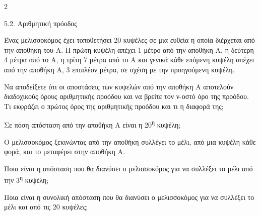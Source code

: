 \begin{ylh}{2}
    \item 5.2. Αριθμητική πρόοδος
\end{ylh}
Ένας μελισσοκόμος έχει τοποθετήσει 20 κυψέλες σε μια ευθεία η οποία διέρχεται από την αποθήκη του Α. Η πρώτη κυψέλη απέχει 1 μέτρο από την αποθήκη Α, η δεύτερη 4 μέτρα από το Α, η τρίτη 7 μέτρα από το Α και γενικά κάθε επόμενη κυψέλη απέχει από την αποθήκη Α, 3 επιπλέον μέτρα, σε σχέση με την προηγούμενη κυψέλη.

\begin{alist}
\item Να αποδείξετε ότι οι αποστάσεις των κυψελών από την αποθήκη Α αποτελούν διαδοχικούς όρους αριθμητικής προόδου και να βρείτε τον ν-οστό όρο της προόδου. Τι εκφράζει ο πρώτος όρος της αριθμητικής προόδου και τι η διαφορά της;

\item Σε πόση απόσταση από την αποθήκη Α είναι η 20\textsuperscript{η} κυψέλη;
\item Ο μελισσοκόμος ξεκινώντας από την αποθήκη συλλέγει το μέλι, από μια κυψέλη κάθε φορά, και το μεταφέρει στην αποθήκη Α.
\begin{rlist}
\item
  Ποια είναι η απόσταση που θα διανύσει ο μελισσοκόμος για να συλλέξει το μέλι από την 3\textsuperscript{η} κυψέλη;
\item
  Ποια είναι η συνολική απόσταση που θα διανύσει ο μελισσοκόμος για να συλλέξει το μέλι και από τις 20 κυψέλες;
\end{rlist}
\end{alist}

